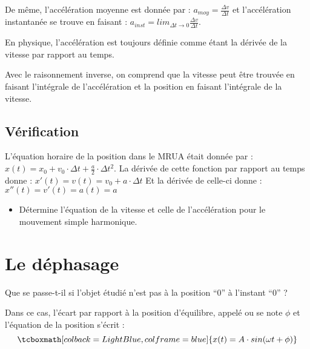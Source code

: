 De même, l'accélération moyenne est donnée par : \(a_{moy}=\frac{\Delta v}{\Delta t}\) et l'accélération instantanée se trouve en faisant : \(a_{inst}= lim_{\Delta t \rightarrow 0} \frac{\Delta v}{\Delta t}\).

\begin{encadre}
    En physique, l'accélération est toujours définie comme étant la dérivée de la vitesse par rapport au temps.
\end{encadre}

Avec le raisonnement inverse, on comprend que la vitesse peut être trouvée en faisant l'intégrale de l'accélération et la position en faisant l'intégrale de la vitesse.

\subsection{Vérification}
L'équation horaire de la position dans le MRUA était donnée par : \(x(t)=x_0 + v_0 \cdot \Delta t + \frac{a}{2} \cdot \Delta t^2\).
La dérivée de cette fonction par rapport au temps donne : \(x'(t)=v(t)=v_0 + a \cdot \Delta t\)
Et la dérivée de celle-ci donne : \(x''(t)=v'(t)=a(t)=a\)

\begin{itemize}[label=$\rightarrow$]
    \item Détermine l'équation de la vitesse et celle de l'accélération pour le mouvement simple harmonique.
\end{itemize}

\newpage

\section{Le déphasage}
Que se passe-t-il si l'objet étudié n'est pas à la position \enquote{0} à l'instant \enquote{0} ?

Dans ce cas, l'écart par rapport à la position d'équilibre, appelé  ou  se note \(\phi\) et l'équation de la position s'écrit :
\begin{equation}
    \tcboxmath[colback=LightBlue,colframe=blue]
    {x(t)=A \cdot sin(\omega t + \phi)}
\end{equation}

\begin{figure}[h!]
    \centering
    
\end{figure}

